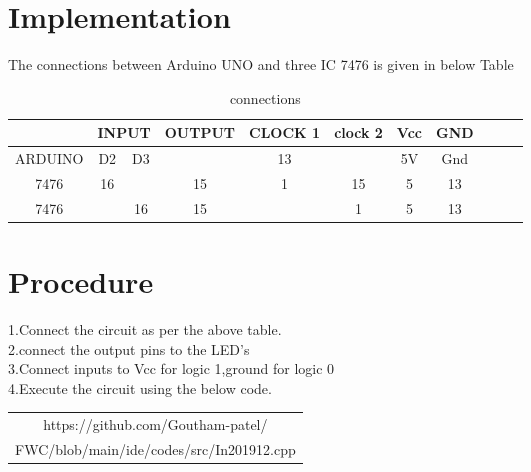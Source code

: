 \documentclass[journal,12pt]{article}
\begin{document}
\section{Implementation}
The connections between Arduino UNO and three IC 7476 is given in below Table \\
\begin{table}[h]
  \begin{center}
  \begin{tabular}{|c|c|c|c|c|c|c|c|c|c|c|}
    \hline & \multicolumn{2}{|c|}{INPUT} & OUTPUT & CLOCK 1 & clock 2 & Vcc & GND \\
    \hline ARDUINO & D2 & D3 &   &  13 &    & 5V & Gnd  \\
    \hline 7476 & \multicolumn{1}{|c|}{16} & \multicolumn{1}{|c|}{} & \multicolumn{1}{|c|}{15} & 1 & 15 & 5 & 13 \\
    \hline 7476 & \multicolumn{1}{|c|}{} & \multicolumn{1}{|c|}{16} &  15 &  & 1 & 5 & 13 \\
            \hline
  \end{tabular}
  \end{center}
  \caption{connections}
  \label{table:1}
\end{table}
\section{Procedure}
\begin{raggedright}
    1.Connect the circuit as per the above table.\\
    2.connect the output pins to the LED's \\
    3.Connect inputs to Vcc for logic 1,ground for logic 0 \\
    4.Execute the circuit using the below code.\\
\begin{table}[h]
\centering
  \begin{tabular}{|c|}
  \hline
   https://github.com/Goutham-patel/\\
	  FWC/blob/main/ide/codes/src/In201912.cpp\\
  \hline
\end{tabular}
\end{table}
\end{raggedright}

\end{document}
